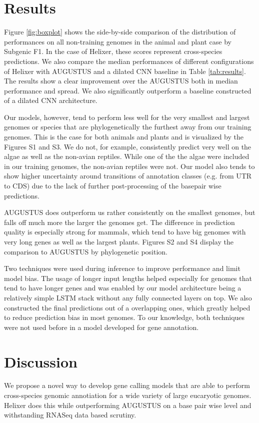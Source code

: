 \documentclass{bioinfo}
\begin{document}
\section{Results}
Figure \ref{fig:boxplot} shows the side-by-side comparison of the distribution of performances on all non-training genomes in the animal and plant case by Subgenic F1. In the case of Helixer, these scores represent cross-species predictions. We also compare the median performances of different configurations of Helixer with AUGUSTUS and a dilated CNN baseline in Table \ref{tab:results}. The results show a clear improvement over the AUGUSTUS both in median performance and spread. We also significantly outperform a baseline constructed of a dilated CNN architecture.

Our models, however, tend to perform less well for the very smallest and largest genomes or species that are phylogenetically the furthest away from our training genomes. This is the case for both animals and plants and is visualized by the Figures S1 and S3. We do not, for example, consistently predict very well on the algae as well as the non-avian reptiles. While one of the the algae were included in our training genomes, the non-avian reptiles were not. Our model also tends to show higher uncertainty around transitions of annotation classes (e.g. from UTR to CDS) due to the lack of further post-processing of the basepair wise predictions.

AUGUSTUS does outperform us rather consistently on the smallest genomes, but falls off much more the larger the genomes get. The difference in prediction quality is especially strong for mammals, which tend to have big genomes with very long genes as well as the largest plants. Figures S2 and S4 display the comparison to AUGUSTUS by phylogenetic position.

Two techniques were used during inference to improve performance and limit model bias. The usage of longer input lengths helped especially for genomes that tend to have longer genes and was enabled by our model architecture being a relatively simple LSTM stack without any fully connected layers on top. We also constructed the final predictions out of a overlapping ones, which greatly helped to reduce prediction bias in most genomes. To our knowledge, both techniques were not used before in a model developed for gene annotation. 

\section{Discussion}
We propose a novel way to develop gene calling models that are able to perform cross-species genomic annotiation for a wide variety of large eucaryotic genomes. Helixer does this while outperforming AUGUSTUS on a base pair wise level and withstanding RNASeq data based scrutiny. 
\end{document}
